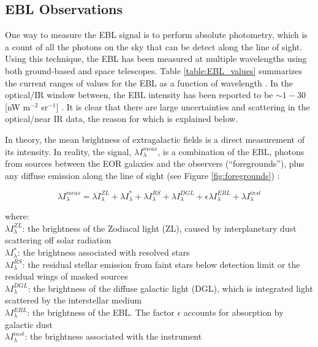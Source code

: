 \subsection{EBL Observations}

One way to measure the EBL signal is to perform absolute photometry, which is a count of all the photons on the sky that can be detect along the line of sight. 
Using this technique, the EBL has been measured at multiple wavelengths using both ground-based and space telescopes. Table \ref{table:EBL_values} summarizes the current ranges of values for the EBL as a function of wavelength \citep{Cooray2016}. In the optical/IR window between, the EBL intensity has been reported to be $\sim 1 - 30$ [nW m$^{-2}$ sr$^{-1}$] \citep{Giavalisco2004, Cooray2004, Kashlinsky2005, Kashlinsky2007, Thompson2007, Matsumoto2011, HESS2013, ZemcovScience, Zemcov2017}. It is clear that there are large uncertainties and scattering in the optical/near IR data, the reason for which is explained below.

In theory, the mean brightness of extragalactic fields is a direct measurement of its intensity. In reality, the signal, $\lambda I_\lambda^{meas}$, is a combination of the EBL, photons from sources between the EOR galaxies and the observers (``foregrounds''), plus any diffuse emission along the line of sight (see Figure \ref{fig:foregrounds}) \citep{Zemcov2017}:

\begin{equation}
	\lambda I_\lambda^{meas} = \lambda I_\lambda^{ZL} + \lambda I_\lambda^{*} + \lambda I_\lambda^{RS} + \lambda I_\lambda^{DGL} + \epsilon \lambda I_\lambda^{EBL} + \lambda I_\lambda ^{inst}
\end{equation}

\noindent where:\\
$\lambda I_\lambda^{ZL}$: the brightness of the Zodiacal light (ZL), caused by interplanetary dust scattering off solar radiation\\
$\lambda I_\lambda^{*}$: the brightness associated with resolved stars\\
$\lambda I_\lambda^{RS}$: the residual stellar emission from faint stars below detection limit or the residual wings of masked sources\\
$\lambda I_\lambda^{DGL}$: the brightness of the diffuse galactic light (DGL), which is integrated light scattered by the interstellar medium\\
$\lambda I_\lambda^{EBL}$: the brightness of the EBL. The factor $\epsilon$ accounts for absorption by galactic dust\\
$\lambda I_\lambda ^{inst}$: the brightness associated with the instrument

